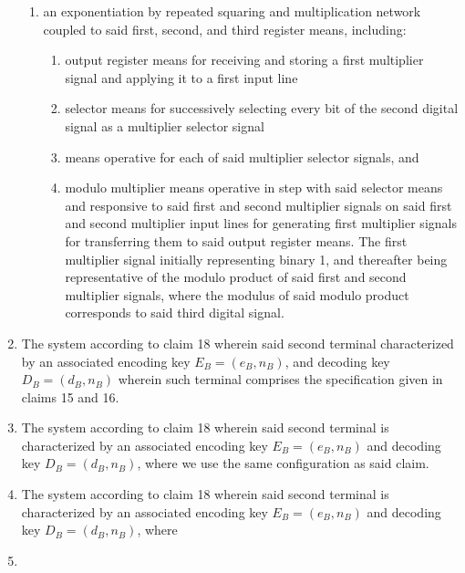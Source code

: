 \documentclass[12pt, a4paper]{article}
\begin{document}
\begin{enumerate}
\begin{enumerate}
    \item an exponentiation by repeated squaring and multiplication network coupled to said first, second, and third register means, including:
    
   	 \begin{enumerate}
   	 
   	 \item output register means for receiving and storing a first multiplier signal and applying it to a first input line
   	 
   	 \item selector means for successively selecting every bit of the second digital signal as a multiplier selector signal
   	 
   	 \item means operative for each of said multiplier selector signals, and
   	 
   	 \item modulo multiplier means operative in step with said selector means and responsive to said first and second multiplier signals on said first and second multiplier input lines for generating first multiplier signals for transferring them to said output register means. The first multiplier signal initially representing binary 1, and thereafter being representative of the modulo product of said first and second multiplier signals, where the modulus of said modulo product corresponds to said third digital signal.
   	 
   	 \end{enumerate}
    
    \end{enumerate}

\item The system according to claim 18 wherein said second terminal characterized by an associated encoding key $E_B = (e_B, n_B)$, and decoding key $D_B = (d_B, n_B)$ wherein such terminal comprises the specification given in claims 15 and 16.


\item The system according to claim 18 wherein said second terminal is characterized by an associated encoding key $E_B =(e_B, n_B)$ and decoding key $D_B =(d_B, n_B)$, where we use the same configuration as said claim.

\item The system according to claim 18 wherein said second terminal is characterized by an associated encoding key $E_B =(e_B, n_B)$ and decoding key $D_B =(d_B, n_B)$, where 

\item 




\end{enumerate}
\end{document}

